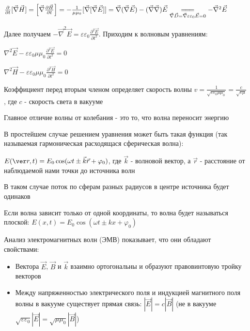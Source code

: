 \documentclass[12pt]{article}
\begin{document}
$\frac{\partial}{\partial t} [\vec \nabla \vec H] = \left[\vec \nabla \frac{\partial \vec H}{\partial t}\right] = 
- \frac{1}{\mu \mu_0} [\vec \nabla [\vec \nabla \vec E]] = \vec \nabla (\vec \nabla \vec E) - (\vec \nabla \vec \nabla) \vec E 
\underset{\vec \nabla \vec D = \vec \nabla \varepsilon \varepsilon_0 \vec E = 0}{=\joinrel=\joinrel=} -\vec \nabla^2 \vec E$

Далее получаем $-\vec \nabla^2 \vec E = \varepsilon \varepsilon_0 \frac{\partial^2 \vec E}{\partial t^2}$. 
Приходим к волновым уравнениям: 

\begin{center}
    $\nabla^2 \vec E - \varepsilon \varepsilon_0 \mu \mu_0 \frac{\partial^2 \vec E}{\partial t^2} = 0$

    $\nabla^2 \vec H - \varepsilon \varepsilon_0 \mu \mu_0 \frac{\partial^2 \vec H}{\partial t^2} = 0$
\end{center}

Коэффициент перед вторым членом определяет скорость волны $v = \frac{1}{\sqrt{\varepsilon \varepsilon_0 \mu \mu_0}} = \frac{c}{\sqrt{\varepsilon \mu}}$, где $c$ - скорость света в вакууме

Главное отличие волны от колебания - это то, что волна переносит энергию

В простейшем случае решением уравнения может быть такая функция (так называемая гармоническая расходящася сферическая волна):

$E(\ver r, t) = E_0 \cos (\omega t \pm \vec k \vec r + \varphi_0)$, где $\vec k$ - волновой вектор, а $\vec r$ - расстояние от наблюдаемой нами точки до источника волн

В таком случае поток по сферам разных радиусов в центре источника будет одинаков

Если волна зависит только от одной координаты, то волна будет называться плоской: $E(x, t) = E_0 \cos (\omega t \pm k x + \varphi_0)$

Анализ электромагнитных волн (ЭМВ) показывает, что они обладают свойствами:

\begin{itemize}
    \item Вектора $\vec E$, $\vec B$ и $\vec k$ взаимно ортогональны и образуют правовинтовую тройку векторов
    \item Между напряженностью электрического поля и индукцией магнитного поля волны в вакууме существует прямая связь:
    $|\vec E| = c |\vec B|$ (не в вакууме $\sqrt{\varepsilon \varepsilon_0} |\vec E| = \sqrt{\mu \mu_0} |\vec B|$)
\end{itemize}
\end{document}
